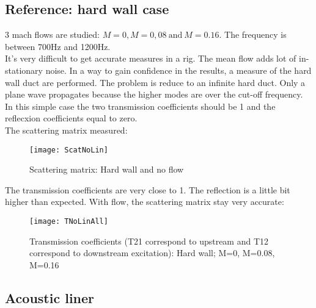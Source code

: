 \subsection{Reference: hard wall case}
3 mach flows are studied: $M=0, M=0,08\ \text{and}\ M=0.16$. The frequency is between 700Hz and 1200Hz.\\
It's very difficult to get accurate measures in a rig. The mean flow adds lot of in-stationary noise. In a way to gain confidence in the results, a measure of the hard wall duct are performed. The problem is reduce to an infinite hard duct. Only a plane wave propagates because the higher modes are over the cut-off frequency. In this simple case the two transmission coefficients should be 1 and the reflecxion coefficients equal to zero.\\
The scattering matrix measured:
\begin{figure}[H] \centering
    \texttt{[image: ScatNoLin]}
    \caption{Scattering matrix: Hard wall and no flow }
\end{figure}
\noindent The transmission coefficients are very close to 1. The reflection is a little bit higher than expected. With flow, the scattering matrix stay very accurate:
\begin{figure}[H] \centering
    \texttt{[image: TNoLinAll]}
    \caption{Transmission coefficients (T21 correspond to upstream and  T12 correspond to downstream excitation): Hard wall; M=0, M=0.08, M=0.16 }
\end{figure}
\subsection{Acoustic liner}
